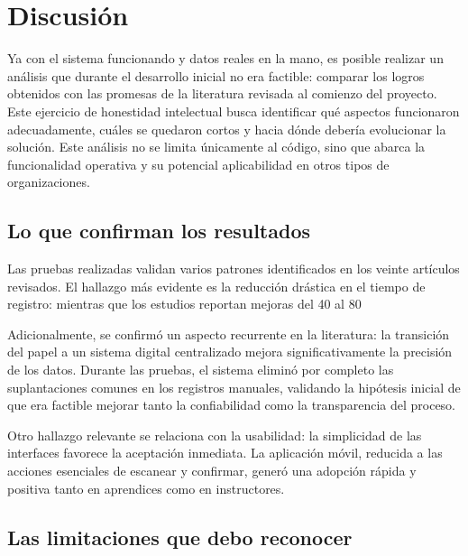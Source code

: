 \section{Discusión}

Ya con el sistema funcionando y datos reales en la mano, es posible realizar un análisis que durante el desarrollo inicial no era factible: comparar los logros obtenidos con las promesas de la literatura revisada al comienzo del proyecto. Este ejercicio de honestidad intelectual busca identificar qué aspectos funcionaron adecuadamente, cuáles se quedaron cortos y hacia dónde debería evolucionar la solución. Este análisis no se limita únicamente al código, sino que abarca la funcionalidad operativa y su potencial aplicabilidad en otros tipos de organizaciones.

\subsection{Lo que confirman los resultados}

Las pruebas realizadas validan varios patrones identificados en los veinte artículos revisados. El hallazgo más evidente es la reducción drástica en el tiempo de registro: mientras que los estudios reportan mejoras del 40 al 80%

Adicionalmente, se confirmó un aspecto recurrente en la literatura: la transición del papel a un sistema digital centralizado mejora significativamente la precisión de los datos. Durante las pruebas, el sistema eliminó por completo las suplantaciones comunes en los registros manuales, validando la hipótesis inicial de que era factible mejorar tanto la confiabilidad como la transparencia del proceso.

Otro hallazgo relevante se relaciona con la usabilidad: la simplicidad de las interfaces favorece la aceptación inmediata. La aplicación móvil, reducida a las acciones esenciales de escanear y confirmar, generó una adopción rápida y positiva tanto en aprendices como en instructores.

\subsection{Las limitaciones que debo reconocer}

